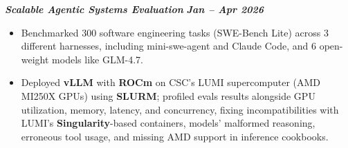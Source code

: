 \documentclass[11pt,a4paper]{article}
\newcommand{\projectheader}[2]{%
    \Needspace{7\baselineskip}%
    \noindent\textbf{\textit{#1}} \hfill \textbf{\textit{#2}}%
}
\begin{document}
\projectheader{Scalable Agentic Systems Evaluation}{Jan -- Apr 2026}
\begin{itemize}
    \item Benchmarked 300 software engineering tasks (SWE-Bench Lite) across 3 different harnesses, including mini-swe-agent and Claude Code, and 6 open-weight models like GLM-4.7.
    \item Deployed \textbf{vLLM} with \textbf{ROCm} on CSC's LUMI supercomputer (AMD MI250X GPUs) using \textbf{SLURM}; profiled evals results alongside GPU utilization, memory, latency, and concurrency, fixing incompatibilities with LUMI's \textbf{Singularity}-based containers, models' malformed reasoning, erroneous tool usage, and missing AMD support in inference cookbooks.
\end{itemize}
\end{document}
